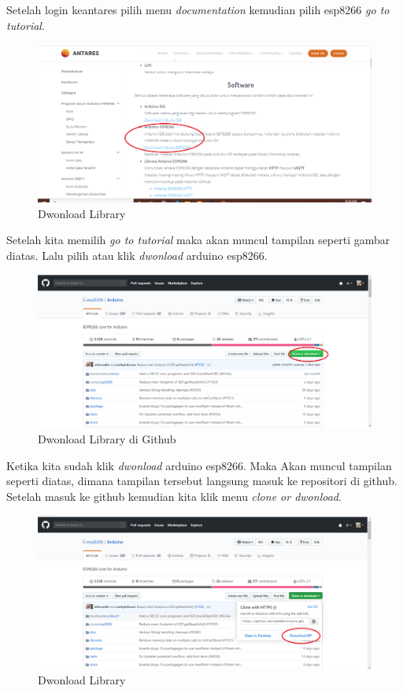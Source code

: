 \begin{enumerate}
     \par Setelah login keantares pilih menu \textit{documentation} kemudian  pilih esp8266 \textit{go to tutorial}.
      \begin{figure}[H]
    \centering
    \includegraphics[width=1\textwidth]{figures/antares15.png}
    \caption{Dwonload Library}
    \label{print}
    \end{figure}
    \par Setelah kita memilih \textit{go to tutorial} maka akan muncul tampilan seperti gambar diatas. Lalu pilih atau klik \textit{dwonload} arduino esp8266.
      \begin{figure}[H]
    \centering
    \includegraphics[width=1\textwidth]{figures/antares16.png}
    \caption{Dwonload Library di Github}
    \label{print}
    \end{figure}
    
    \par Ketika kita sudah klik \textit{dwonload} arduino esp8266. Maka Akan muncul tampilan seperti diatas, dimana tampilan tersebut langsung masuk ke repositori di github. Setelah masuk ke github kemudian kita klik menu \textit{clone or dwonload}.
    
      \begin{figure}[H]
    \centering
    \includegraphics[width=1\textwidth]{figures/antares17.png}
    \caption{Dwonload Library}
    \label{print}
    \end{figure}
     

\end{enumerate}
